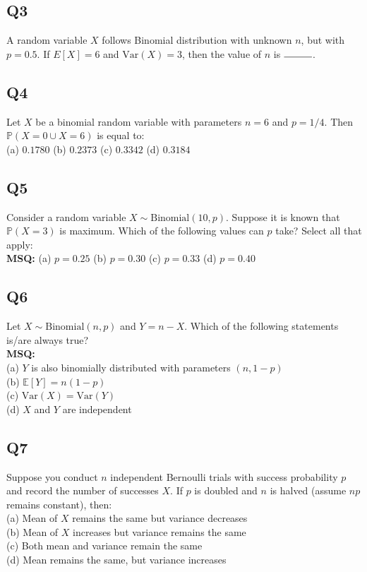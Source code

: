 \subsection*{Q3}
A random variable $X$ follows Binomial distribution with unknown $n$, but with $p = 0.5$. If $E[X] = 6$ and $\text{Var}(X) = 3$, then the value of $n$ is $\rule{1cm}{0.15mm}$.

\subsection*{Q4}
Let $X$ be a binomial random variable with parameters $n = 6$ and $p = 1/4$. Then $\mathbb{P}(X = 0 \cup X = 6)$ is equal to:\\  
(a) $0.1780$ \quad (b) $0.2373$ \quad (c) $0.3342$ \quad (d) $0.3184$

\subsection*{Q5}
Consider a random variable $X \sim \text{Binomial}(10, p)$. Suppose it is known that $\mathbb{P}(X=3)$ is maximum. Which of the following values can $p$ take?  
Select all that apply:\\  
\textbf{MSQ:}  
(a) $p = 0.25$ \quad (b) $p = 0.30$ \quad (c) $p = 0.33$ \quad (d) $p = 0.40$

\subsection*{Q6}
Let $X \sim \text{Binomial}(n, p)$ and $Y = n - X$. Which of the following statements is/are always true? \\ 
\textbf{MSQ:}  \\
(a) $Y$ is also binomially distributed with parameters $(n, 1 - p)$  \\
(b) $\mathbb{E}[Y] = n(1 - p)$  \\
(c) $\text{Var}(X) = \text{Var}(Y)$  \\
(d) $X$ and $Y$ are independent

\subsection*{Q7}
Suppose you conduct $n$ independent Bernoulli trials with success probability $p$ and record the number of successes $X$. If $p$ is doubled and $n$ is halved (assume $np$ remains constant), then:\\  
(a) Mean of $X$ remains the same but variance decreases  \\
(b) Mean of $X$ increases but variance remains the same  \\
(c) Both mean and variance remain the same  \\
(d) Mean remains the same, but variance increases  


